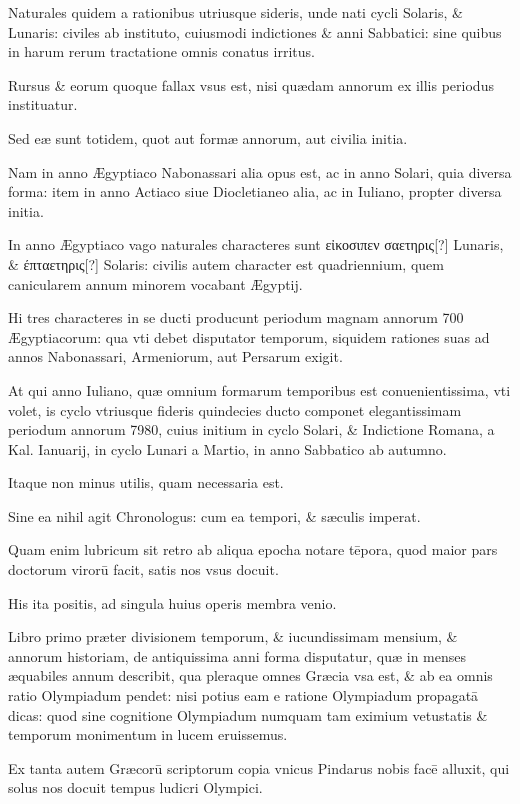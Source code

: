 \begin{parnumbers}
Naturales quidem a rationibus
utriusque sideris, unde nati cycli Solaris, \& Lunaris: civiles
ab instituto, cuiusmodi indictiones \& anni Sabbatici: sine quibus in
harum rerum tractatione omnis conatus irritus. 

Rursus \& eorum
quoque fallax vsus est, nisi quædam annorum ex illis periodus instituatur.

Sed eæ sunt totidem, quot aut formæ annorum, aut civilia
initia.

Nam in anno Ægyptiaco Nabonassari alia opus est, ac in anno
Solari, quia diversa forma: item in anno Actiaco siue Diocletianeo
alia, ac in Iuliano, propter diversa initia.

In anno Ægyptiaco vago
naturales characteres sunt \textgreek{εἰκοσιπεν σαετηρις[?]} Lunaris, \&
\textgreek{έπταετηρις[?]} Solaris:
civilis autem character est quadriennium, quem canicularem
annum minorem vocabant Ægyptij.

Hi tres characteres in se ducti
producunt periodum magnam annorum 700 Ægyptiacorum: qua
vti debet disputator temporum, siquidem rationes suas ad annos
Nabonassari, Armeniorum, aut Persarum exigit.

At qui anno Iuliano,
quæ omnium formarum temporibus est conuenientissima, vti
volet, is cyclo vtriusque fideris quindecies ducto componet elegantissimam
periodum annorum 7980, cuius initium in cyclo Solari,
\& Indictione Romana, a Kal. Ianuarij, in cyclo Lunari a Martio, in
anno Sabbatico ab autumno.

Itaque non minus utilis, quam necessaria
est.

Sine ea nihil agit Chronologus: cum ea tempori, \& sæculis
imperat.

Quam enim lubricum sit retro ab aliqua epocha notare tēpora,
quod maior pars doctorum virorū facit, satis nos vsus docuit.

His ita positis, ad singula huius operis membra venio.

Libro primo
præter divisionem temporum, \& iucundissimam mensium, \&
annorum historiam, de antiquissima anni forma disputatur, quæ in
menses æquabiles annum describit, qua pleraque omnes Græcia vsa
est, \& ab ea omnis ratio Olympiadum pendet: nisi potius eam e ratione
Olympiadum propagatā dicas: quod sine cognitione Olympiadum
numquam tam eximium vetustatis \& temporum monimentum
in lucem eruissemus. 

Ex tanta autem Græcorū scriptorum
copia vnicus Pindarus nobis facē alluxit, qui solus nos docuit tempus
ludicri Olympici.


\end{parnumbers}
